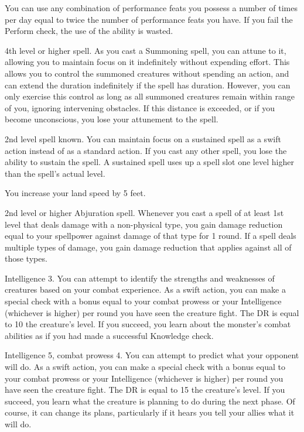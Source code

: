 You can use any combination of performance feats you possess a number of times per day equal to twice the number of performance feats you have.
If you fail the Perform check, the use of the ability is wasted.

\featpre 4th level or higher  spell.
\featben As you cast a Summoning spell, you can attune to it, allowing you to maintain focus on it indefinitely without expending effort.
This allows you to control the summoned creatures without spending an action, and can extend the duration indefinitely if the spell has \durshort duration.
However, you can only exercise this control as long as all summoned creatures remain within \rnglong range of you, ignoring intervening obstacles.
If this distance is exceeded, or if you become unconscious, you lose your attunement to the spell.

\featpre 2nd level spell known.
\featben You can maintain focus on a sustained spell as a swift action instead of as a standard action.
If you cast any other spell, you lose the ability to sustain the spell.
A sustained spell uses up a spell slot one level higher than the spell's actual level.

\featben You increase your land speed by 5 feet.

\featpre 2nd level or higher Abjuration spell.
\featben Whenever you cast a spell of at least 1st level that deals damage with a non-physical type, you gain damage reduction equal to your spellpower against damage of that type for 1 round.
If a spell deals multiple types of damage, you gain damage reduction that applies against all of those types.

\featpre Intelligence 3.
\featben You can attempt to identify the strengths and weaknesses of creatures based on your combat experience.
As a swift action, you can make a special check with a bonus equal to your combat prowess or your Intelligence (whichever is higher)  per round you have seen the creature fight.
The DR is equal to 10 \add the creature's level.
If you succeed, you learn about the monster's combat abilities as if you had made a successful Knowledge check.

\featpres Intelligence 5, combat prowess 4.
\featben You can attempt to predict what your opponent will do.
As a swift action, you can make a special check with a bonus equal to your combat prowess or your Intelligence (whichever is higher)  per round you have seen the creature fight.
The DR is equal to 15 \add the creature's level.
If you succeed, you learn what the creature is planning to do during the next phase.
Of course, it can change its plans, particularly if it hears you tell your allies what it will do.

